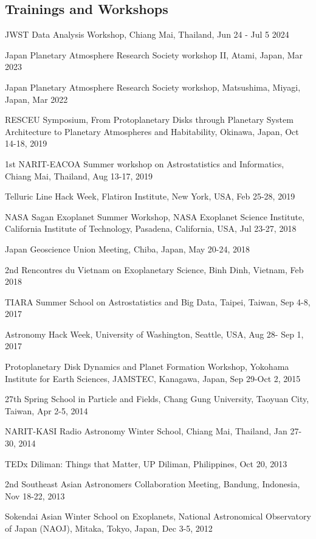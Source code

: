 \documentclass[12pt,letterpaper]{article}
\begin{document}
\subsection{Trainings and Workshops}
\begin{list}{}{\cvlist}
    \item JWST Data Analysis Workshop, Chiang Mai, Thailand, Jun 24 - Jul 5 2024
    \item Japan Planetary Atmosphere Research Society workshop II, Atami, Japan, Mar 2023
    \item Japan Planetary Atmosphere Research Society workshop, Matsushima, Miyagi, Japan, Mar 2022
    \item RESCEU Symposium, From Protoplanetary Disks through Planetary System Architecture to Planetary Atmospheres and Habitability, Okinawa, Japan, Oct 14-18, 2019
    \item 1st NARIT-EACOA Summer workshop on Astrostatistics and Informatics, Chiang Mai, Thailand, Aug 13-17, 2019
    \item Telluric Line Hack Week, Flatiron Institute, New York, USA, Feb 25-28, 2019
    \item NASA Sagan Exoplanet Summer Workshop, NASA Exoplanet Science Institute, California Institute of Technology, Pasadena, California, USA, Jul 23-27, 2018
    \item Japan Geoscience Union Meeting, Chiba, Japan, May 20-24, 2018
    \item 2nd Rencontres du Vietnam on Exoplanetary Science, Binh Dinh, Vietnam, Feb 2018
    \item TIARA Summer School on Astrostatistics and Big Data, Taipei, Taiwan, Sep 4-8, 2017
    \item Astronomy Hack Week, University of Washington, Seattle, USA, Aug 28- Sep 1, 2017
    \item Protoplanetary Disk Dynamics and Planet Formation Workshop, Yokohama Institute for Earth Sciences, JAMSTEC, Kanagawa, Japan, Sep 29-Oct 2, 2015
    \item 27th Spring School in Particle and Fields, Chang Gung University, Taoyuan City, Taiwan, Apr 2-5, 2014
    \item NARIT-KASI Radio Astronomy Winter School, Chiang Mai, Thailand, Jan 27-30, 2014
    \item TEDx Diliman: Things that Matter, UP Diliman, Philippines, Oct 20, 2013
    \item 2nd Southeast Asian Astronomers Collaboration Meeting, Bandung, Indonesia, Nov 18-22, 2013
    \item Sokendai Asian Winter School on Exoplanets, National Astronomical Observatory of Japan (NAOJ), Mitaka, Tokyo, Japan, Dec 3-5, 2012

\end{list}
\end{document}
